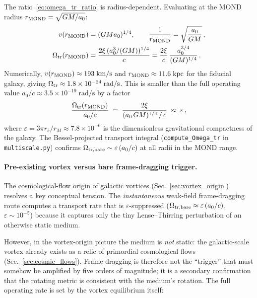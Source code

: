 \documentclass[11pt]{article}
\begin{document}
The ratio~\eqref{eq:omega_tr_ratio} is radius-dependent.
Evaluating at the MOND radius
$r_{\rm MOND}=\sqrt{GM/a_0}$:
\begin{align}
v(r_{\rm MOND}) &= (GMa_0)^{1/4}, \qquad
\frac{1}{r_{\rm MOND}} = \sqrt{\frac{a_0}{GM}}\,,\nonumber\\
\Omega_{\rm tr}(r_{\rm MOND})
  &= \frac{2\xi\,(a_0^3/(GM))^{1/4}}{c}
  = \frac{2\xi}{c}\,\frac{a_0^{3/4}}{(GM)^{1/4}}\,.
\label{eq:omega_tr_final}
\end{align}
Numerically, $v(r_{\rm MOND})\approx 193\;\mathrm{km/s}$
and $r_{\rm MOND}\approx 11.6\;\mathrm{kpc}$ for
the fiducial galaxy, giving
$\Omega_{\rm tr}\approx 1.8\times 10^{-24}\;\mathrm{rad/s}$.
This is smaller than the full operating value
$a_0/c\approx 3.5\times 10^{-19}\;\mathrm{rad/s}$
by a factor
\begin{equation}
\frac{\Omega_{\rm tr}(r_{\rm MOND})}{a_0/c}
  \;=\; \frac{2\xi}{(a_0\,GM)^{1/4}\,/\,c}
  \;\approx\; \varepsilon\,,
\label{eq:omega_tr_gap}
\end{equation}
where $\varepsilon=3\pi r_s/r_M\approx 7.8\times 10^{-6}$
is the dimensionless gravitational compactness of the galaxy.
The Bessel-projected transport integral
(\nolinkurl{compute_Omega_tr} in \nolinkurl{multiscale.py})
confirms $\Omega_{\rm tr,bare}\sim\varepsilon\,(a_0/c)$
at all radii in the MOND range.

\paragraph{Pre-existing vortex versus bare frame-dragging trigger.}
The cosmological-flow origin of galactic vortices
(Sec.~\ref{sec:vortex_origin}) resolves a key conceptual tension.
The \emph{instantaneous} weak-field frame-dragging route computes a
transport rate that is $\varepsilon$-suppressed
($\Omega_{\rm tr,bare}\approx\varepsilon\,(a_0/c)$,
$\varepsilon\sim 10^{-5}$) because it captures only the tiny
Lense--Thirring perturbation of an otherwise static medium.

However, in the vortex-origin picture the medium is \emph{not}
static: the galactic-scale vortex already exists as a relic of
primordial cosmological flows (Sec.~\ref{sec:cosmic_flows}).
Frame-dragging is therefore not the ``trigger'' that must somehow be
amplified by five orders of magnitude; it is a secondary confirmation
that the rotating metric is consistent with the medium's rotation.
The full operating rate is set by the vortex equilibrium itself:
\end{document}
